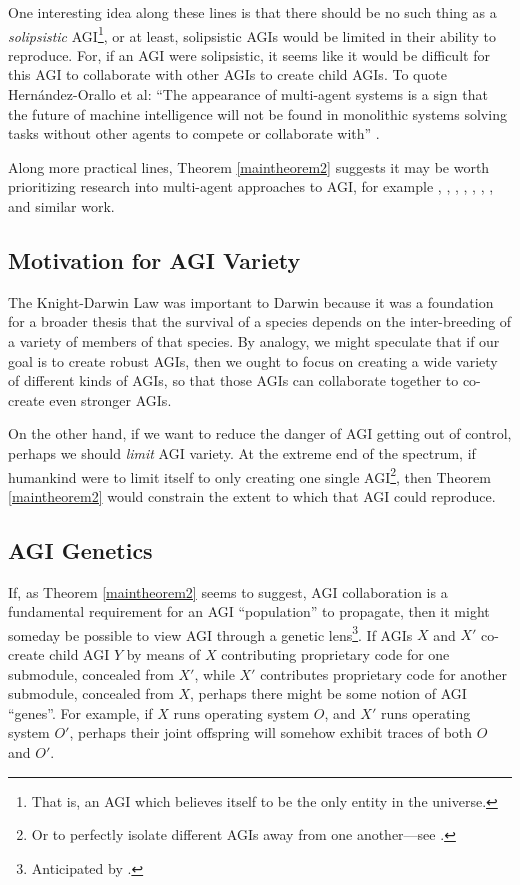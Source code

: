 \documentclass[runningheads]{llncs}
\begin{document}
One interesting idea along these lines is that there should be no
such thing as a \emph{solipsistic} AGI\footnote{That is, an AGI which believes itself
to be the only entity in the universe.}, or at least, solipsistic AGIs would be
limited in their ability to reproduce.
For, if an AGI were solipsistic, it
seems like it would be difficult for this AGI to collaborate with other AGIs
to create child AGIs.
To quote Hern{\'a}ndez-Orallo et al: ``The appearance of multi-agent systems is a sign that
the future of machine intelligence will not be found in monolithic systems
solving tasks without other agents to compete or collaborate with''
\cite{hernandez2011more}.

Along more practical lines, Theorem \ref{maintheorem2} suggests it may be worth
prioritizing research into multi-agent approaches to AGI, for example
\cite{castelfranchi1998modelling}, \cite{hernandez2011more},
\cite{hibbard2011societies}, \cite{lazaridou2018emergence},
\cite{thorisson2004constructionist}, \cite{potyka2016group},
\cite{kolonin2018reputation},
and similar work.

\subsection{Motivation for AGI Variety}

The Knight-Darwin Law was important to
Darwin because it was a foundation for a broader thesis that the survival of a
species depends on the inter-breeding of a variety of members of that species.
By analogy, we might speculate that if our goal is to create robust AGIs, then
we ought to focus on creating a wide variety of different kinds of AGIs, so that
those AGIs can collaborate together to co-create even stronger AGIs.

On the other hand, if we want to reduce the danger of AGI getting out of control,
perhaps we should \emph{limit} AGI variety. At the extreme end
of the spectrum, if humankind were to limit itself to only creating one single
AGI\footnote{Or to perfectly isolate
different AGIs away from
one another---see \cite{yampolskiy2012leakproofing}.}, then
Theorem \ref{maintheorem2} would constrain the extent to which
that AGI could reproduce.


\subsection{AGI Genetics}

If, as Theorem \ref{maintheorem2} seems to suggest, AGI collaboration
is a fundamental requirement for an AGI ``population'' to propagate, then it might
someday be possible to view AGI through a genetic lens\footnote{Anticipated
by \cite{buchanan1988artificial}.}. If AGIs $X$ and $X'$ co-create child AGI $Y$ by
means of $X$ contributing proprietary code for one submodule, concealed from $X'$,
while $X'$ contributes proprietary code for another submodule, concealed from $X$,
perhaps there might be some notion of AGI ``genes''. For example, if $X$ runs operating
system $O$, and $X'$ runs operating system $O'$, perhaps their joint offspring
will somehow exhibit traces of both $O$ and $O'$.
\end{document}
